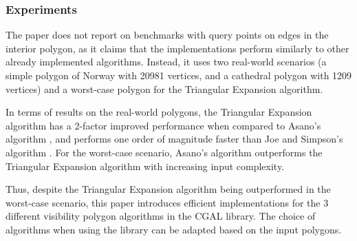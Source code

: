 \subsubsection{Experiments}
The paper does not report on benchmarks with query points on edges in the interior polygon, as it claims that the implementations perform similarly to other already implemented algorithms. Instead, it uses two real-world scenarios (a simple polygon of Norway with 20981 vertices, and a cathedral polygon with 1209 vertices) and a worst-case polygon for the Triangular Expansion algorithm.

In terms of results on the real-world polygons, the Triangular Expansion algorithm has a 2-factor improved performance when compared to Asano's algorithm \cite{asano1985efficient}, and performs one order of magnitude faster than Joe and Simpson's algorithm \cite{joe1987corrections}. For the worst-case scenario, Asano's algorithm \cite{asano1985efficient} outperforms the Triangular Expansion algorithm with increasing input complexity.

Thus, despite the Triangular Expansion algorithm being outperformed in the worst-case scenario, this paper introduces efficient implementations for the 3 different visibility polygon algorithms in the CGAL library. The choice of algorithms when using the library can be adapted based on the input polygons. 
